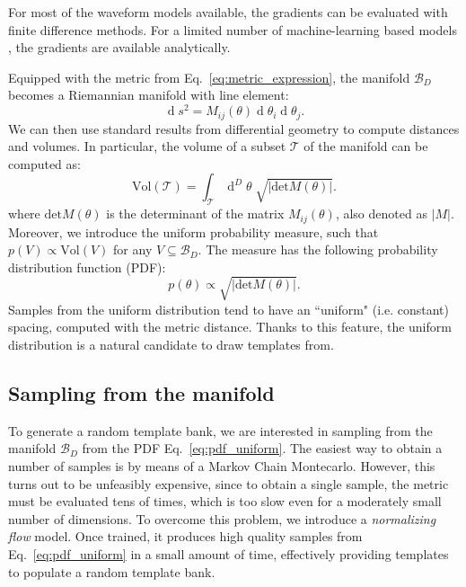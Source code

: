 \documentclass[twocolumn,showpacs,preprintnumbers,nofootinbib,prd,
superscriptaddress,10pt]{revtex4-2}
\renewcommand{\d}[1]{\ensuremath{\operatorname{d}\!{#1}}}
\newcommand{\dvol}[2]{\ensuremath{\operatorname{d}^{#2}\!{#1}}}
\begin{document}
For most of the waveform models available, the gradients can be evaluated with finite difference methods. For a limited number of machine-learning based models \cite{Chua:2018woh, Khan:2020fso, PhysRevD.103.043020, Thomas:2022rmc, Tissino:2022thn}, the gradients are available analytically.

Equipped with the metric from Eq.~\eqref{eq:metric_expression}, the manifold $\mathcal{B}_D$ becomes a Riemannian manifold with line element:
\begin{equation}\label{eq:line_element}
	\d{s^2} = M_{ij}(\theta) \d{\theta_i} \d{\theta_j}.
\end{equation}
We can then use standard results from differential geometry to compute distances and volumes. In particular, the volume of a subset $\mathcal{T}$ of the manifold can be computed as:
\begin{equation}\label{eq:volume_tile}
	\text{Vol}(\mathcal{T}) = \int_\mathcal{T} \dvol{\theta}{D} \; \sqrt{|\text{det}M(\theta)|}.
\end{equation}
where $\text{det}M(\theta)$ is the determinant of the matrix $M_{ij}(\theta)$, also denoted as $|M|$.
%
Moreover, we introduce the uniform probability measure, such that $p(V) \propto \text{Vol}(V)$ for any $V\subseteq \mathcal{B}_D$. The measure has the following probability distribution function (PDF):
\begin{equation}\label{eq:pdf_uniform}
	p(\theta) \propto \sqrt{|\text{det}M(\theta)|}.
\end{equation}
Samples from the uniform distribution tend to have an ``uniform" (i.e. constant) spacing, computed with the metric distance. Thanks to this feature, the uniform distribution is a natural candidate to draw templates from.

\subsection{Sampling from the manifold} \label{sec:normalizing_flow}

To generate a random template bank, we are interested in sampling from the manifold $\mathcal{B}_D$ from the PDF Eq.~\eqref{eq:pdf_uniform}.
The easiest way to obtain a number of samples is by means of a Markov Chain Montecarlo. However, this turns out to be unfeasibly expensive, since to obtain a single sample, the metric must be evaluated tens of times, which is too slow even for a moderately small number of dimensions.
To overcome this problem, we introduce a {\it normalizing flow} model. Once trained, it produces high quality samples from Eq.~\eqref{eq:pdf_uniform} in a small amount of time, effectively providing templates to populate a random template bank.
\end{document}
